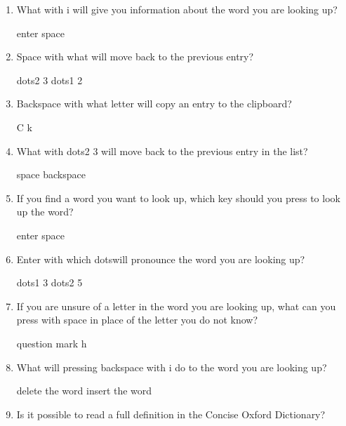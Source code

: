 \documentclass[10pt,letterpaper,twoside]{report}
\begin{document}
{{{{\begin{enumerate}
	\item What with i will give you information about the word you are looking up?
	      
	      enter    space
	      
	      
	      
	\item Space with what will move back to the previous entry?
	      
	      dots2 3   dots1 2
	      
	      
	      
	\item Backspace with what letter will copy an entry to the clipboard?
	      
	      C  k
	      
	      
	      
	\item What with dots2 3 will move back to the previous entry in the list?
	      
	      space   backspace
	      
	      
	      
	\item If you find a word you want to look up, which key should you press to look up the word?
	      
	      enter      space
	      
	      
	      
	\item Enter with which dotswill pronounce the word you are looking up?
	      
	      dots1 3   dots2 5
	      
	      
	      
	\item If you are unsure of a letter in the word you are looking up, what can you press with space in place of the letter you do not know?
	      
	      question mark    h
	      
	      
	      
	\item What will pressing backspace with i do to the word you are looking up?
	      
	      delete the word    insert the word
	      
	      
	      
	\item Is it possible to read a full definition in the Concise Oxford Dictionary?
\end{enumerate}

}}}}
\end{document}
